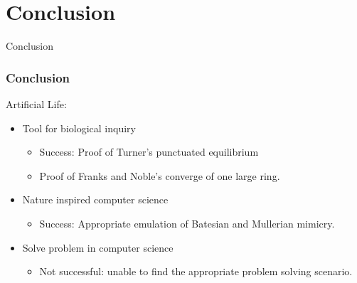 \section{Conclusion}

\frame
{
	\begin{center}
		\LARGE Conclusion
	\end{center}
}

\frame
{
	\frametitle{Conclusion}
	
	Artificial Life:
	\begin{itemize}
		\item Tool for biological inquiry
			\begin{itemize}
				\item Success: Proof of Turner's punctuated equilibrium
				\item Proof of Franks and Noble's converge of one large ring.
			\end{itemize}
		\item Nature inspired computer science
			\begin{itemize}
				\item Success: Appropriate emulation of Batesian and Mullerian mimicry.
			\end{itemize}
		\item Solve problem in computer science
			\begin{itemize}
				\item Not successful: unable to find the appropriate problem solving scenario.
			\end{itemize}
	\end{itemize}
}

%	
